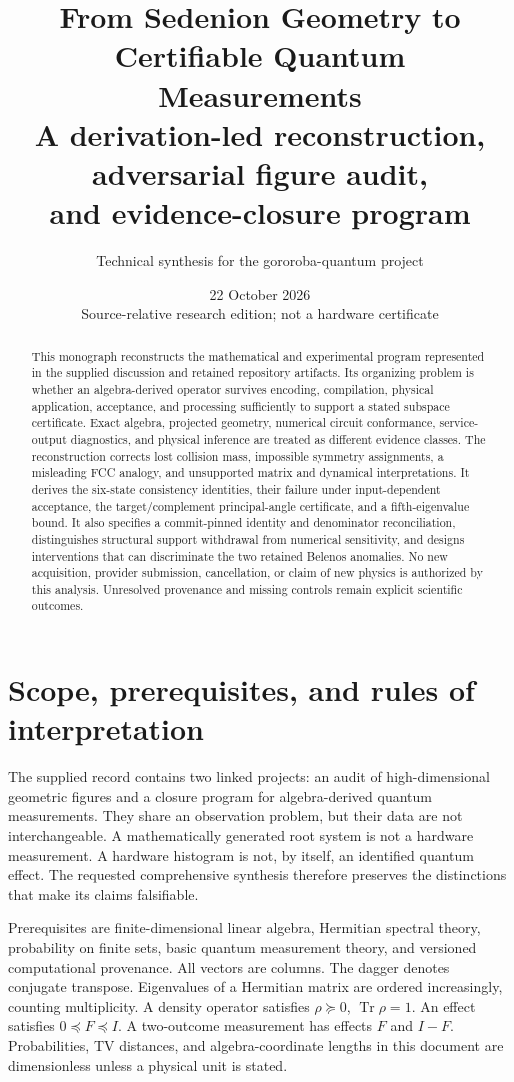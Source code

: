 \documentclass[11pt,a4paper]{article}
\title{From Sedenion Geometry to Certifiable Quantum Measurements\\\large A derivation-led reconstruction, adversarial figure audit,\\and evidence-closure program}
\author{Technical synthesis for the gororoba-quantum project}
\date{22 October 2026\\Source-relative research edition; not a hardware certificate}
\newcommand{\tr}{\operatorname{Tr}}\newcommand{\TV}{\operatorname{TV}}\newcommand{\kerop}{\operatorname{ker}}\newcommand{\rank}{\operatorname{rank}}\newcommand{\diag}{\operatorname{diag}}\newcommand{\ran}{\operatorname{ran}}\newcommand{\norm}[1]{\left\lVert#1\right\rVert}\newcommand{\ket}[1]{\lvert#1\rangle}\newcommand{\bra}[1]{\langle#1\rvert}
\begin{document}
\maketitle
\begin{abstract}
This monograph reconstructs the mathematical and experimental program represented in the supplied discussion and retained repository artifacts. Its organizing problem is whether an algebra-derived operator survives encoding, compilation, physical application, acceptance, and processing sufficiently to support a stated subspace certificate. Exact algebra, projected geometry, numerical circuit conformance, service-output diagnostics, and physical inference are treated as different evidence classes. The reconstruction corrects lost collision mass, impossible symmetry assignments, a misleading FCC analogy, and unsupported matrix and dynamical interpretations. It derives the six-state consistency identities, their failure under input-dependent acceptance, the target/complement principal-angle certificate, and a fifth-eigenvalue bound. It also specifies a commit-pinned identity and denominator reconciliation, distinguishes structural support withdrawal from numerical sensitivity, and designs interventions that can discriminate the two retained Belenos anomalies. No new acquisition, provider submission, cancellation, or claim of new physics is authorized by this analysis. Unresolved provenance and missing controls remain explicit scientific outcomes.
\end{abstract}
\begingroup\small\tableofcontents\endgroup\newpage

\section{Scope, prerequisites, and rules of interpretation}
The supplied record contains two linked projects: an audit of high-dimensional geometric figures and a closure program for algebra-derived quantum measurements. They share an observation problem, but their data are not interchangeable. A mathematically generated root system is not a hardware measurement. A hardware histogram is not, by itself, an identified quantum effect. The requested comprehensive synthesis therefore preserves the distinctions that make its claims falsifiable.

Prerequisites are finite-dimensional linear algebra, Hermitian spectral theory, probability on finite sets, basic quantum measurement theory, and versioned computational provenance. All vectors are columns. The dagger denotes conjugate transpose. Eigenvalues of a Hermitian matrix are ordered increasingly, counting multiplicity. A density operator satisfies $\rho\succeq0$, $\tr\rho=1$. An effect satisfies $0\preceq F\preceq I$. A two-outcome measurement has effects $F$ and $I-F$. Probabilities, TV distances, and algebra-coordinate lengths in this document are dimensionless unless a physical unit is stated.
\end{document}
